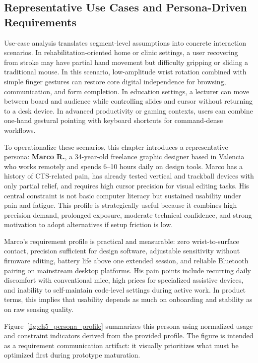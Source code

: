 \subsection{Representative Use Cases and Persona-Driven Requirements}

Use-case analysis translates segment-level assumptions into concrete interaction scenarios. In rehabilitation-oriented home or clinic settings, a user recovering from stroke may have partial hand movement but difficulty gripping or sliding a traditional mouse. In this scenario, low-amplitude wrist rotation combined with simple finger gestures can restore core digital independence for browsing, communication, and form completion. In education settings, a lecturer can move between board and audience while controlling slides and cursor without returning to a desk device. In advanced productivity or gaming contexts, users can combine one-hand gestural pointing with keyboard shortcuts for command-dense workflows.

To operationalize these scenarios, this chapter introduces a representative persona: \textbf{Marco R.}, a 34-year-old freelance graphic designer based in Valencia who works remotely and spends 6--10 hours daily on design tools. Marco has a history of CTS-related pain, has already tested vertical and trackball devices with only partial relief, and requires high cursor precision for visual editing tasks. His central constraint is not basic computer literacy but sustained usability under pain and fatigue. This profile is strategically useful because it combines high precision demand, prolonged exposure, moderate technical confidence, and strong motivation to adopt alternatives if setup friction is low.

Marco's requirement profile is practical and measurable: zero wrist-to-surface contact, precision sufficient for design software, adjustable sensitivity without firmware editing, battery life above one extended session, and reliable Bluetooth pairing on mainstream desktop platforms. His pain points include recurring daily discomfort with conventional mice, high prices for specialized assistive devices, and inability to self-maintain code-level settings during active work. In product terms, this implies that usability depends as much on onboarding and stability as on raw sensing quality.

Figure~\ref{fig:ch5_persona_profile} summarizes this persona using normalized usage and constraint indicators derived from the provided profile. The figure is intended as a requirement communication artifact: it visually prioritizes what must be optimized first during prototype maturation.

